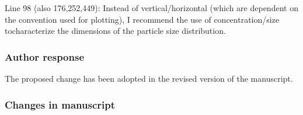 \documentclass[11pt]{scrartcl}
\begin{document}
\begin{itemize}
Line 98 (also 176,252,449): Instead of vertical/horizontal (which are
dependent on the convention used for plotting), I recommend the use of
concentration/size tocharacterize the dimensions of the particle size
distribution.

\subsubsection*{Author response}

The proposed change has been adopted in the revised version of the manuscript.

\subsubsection*{Changes in manuscript}





\end{itemize}
\end{document}
